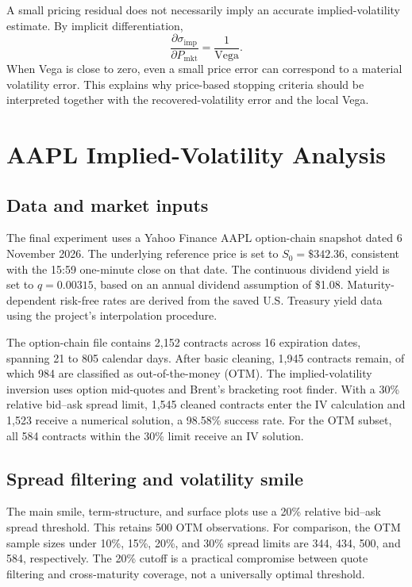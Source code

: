 \documentclass[11pt,a4paper]{article}
\newcommand{\Vega}{\mathrm{Vega}}
\begin{document}
A small pricing residual does not necessarily imply an accurate implied-volatility estimate. By implicit differentiation,
\begin{equation}
  \frac{\partial \sigma_{\mathrm{imp}}}{\partial P_{\mathrm{mkt}}}
  =\frac{1}{\Vega}.
\end{equation}
When Vega is close to zero, even a small price error can correspond to a material volatility error. This explains why price-based stopping criteria should be interpreted together with the recovered-volatility error and the local Vega.

\section{AAPL Implied-Volatility Analysis}

\subsection{Data and market inputs}

The final experiment uses a Yahoo Finance AAPL option-chain snapshot dated 6 November 2026. The underlying reference price is set to $S_0=\$342.36$, consistent with the 15:59 one-minute close on that date. The continuous dividend yield is set to $q=0.00315$, based on an annual dividend assumption of \$1.08. Maturity-dependent risk-free rates are derived from the saved U.S. Treasury yield data using the project's interpolation procedure.

The option-chain file contains 2,152 contracts across 16 expiration dates, spanning 21 to 805 calendar days. After basic cleaning, 1,945 contracts remain, of which 984 are classified as out-of-the-money (OTM). The implied-volatility inversion uses option mid-quotes and Brent's bracketing root finder. With a 30\% relative bid--ask spread limit, 1,545 cleaned contracts enter the IV calculation and 1,523 receive a numerical solution, a 98.58\% success rate. For the OTM subset, all 584 contracts within the 30\% limit receive an IV solution.

\subsection{Spread filtering and volatility smile}

The main smile, term-structure, and surface plots use a 20\% relative bid--ask spread threshold. This retains 500 OTM observations. For comparison, the OTM sample sizes under 10\%, 15\%, 20\%, and 30\% spread limits are 344, 434, 500, and 584, respectively. The 20\% cutoff is a practical compromise between quote filtering and cross-maturity coverage, not a universally optimal threshold.
\end{document}

